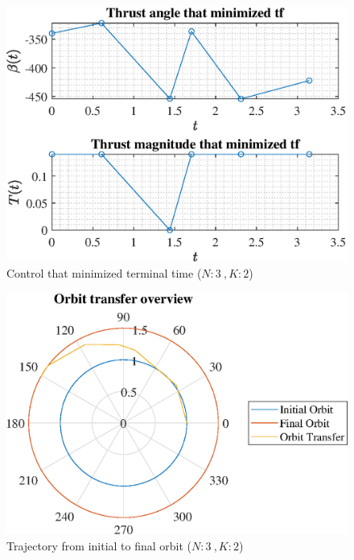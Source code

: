 \documentclass[]{article}
\begin{document}
	\begin{figure}
		\centering
		\includegraphics[scale=0.75]{control_N3_K2_C2_tf.eps}
		\caption{Control that minimized terminal time (\(N:3\ , K:2\))}
		\label{fig:control_N3_K2_C2_tf}
	\end{figure}
	\begin{figure}
		\centering
		\includegraphics[scale=0.75]{orbit_N3_K2_C2_tf.eps}
		\caption{Trajectory from initial to final orbit (\(N:3\ , K:2\))}
		\label{fig:orbit_N3_K2_C2_tf}
	\end{figure}
\end{document}
